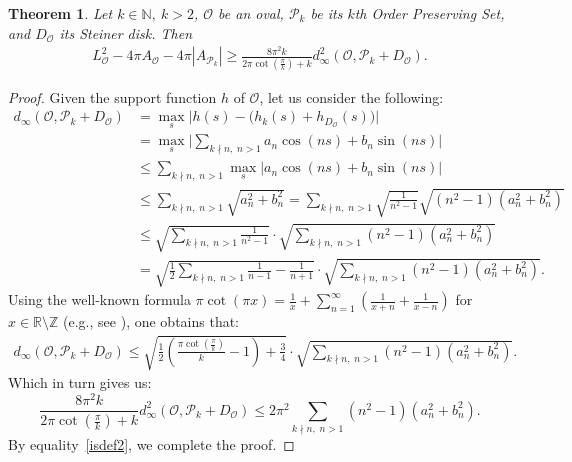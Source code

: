 \documentclass{amsart}
\newtheorem{thm}{Theorem}[section]
\theoremstyle{definition}
\numberwithin{equation}{section}
\begin{document}
\begin{thm}\label{Thmstab1}
Let $k\in \mathbb{N},\ k>2$, $\mathcal{O}$ be an oval, $\mathcal{P}_k$ be its $k$th Order Preserving Set, and $D_{\mathcal{O}}$ its Steiner disk. Then
\begin{align*}
     L_{\mathcal{O}}^2 - 4\pi A_{\mathcal{O}}-4\pi |A_{\mathcal{P}_k}|\geqslant\frac{8\pi^2k}{2 \pi \cot\left(\frac{\pi}{k}\right) +k}d^2_\infty(\mathcal{O},\mathcal{P}_k+ D_{\mathcal{O}}).
\end{align*}
\end{thm}
\begin{proof}
     Given the support function $h$ of $\mathcal{O}$, let us consider the following:
     \begin{align*}       
     d_\infty(\mathcal{O},\mathcal{P}_k+ D_{\mathcal{O}})&=\max_s\Big|h(s)-\Big(h_k(s) + h_{D_{\mathcal{O}}}(s)\Big)\Big|\\ &=\max_s\Big|\sum_{k \nmid n,\; n>1}a_n\cos(ns)+b_n\sin(ns)\Big|\\
     &\leqslant \sum_{k \nmid n, \;n>1}\max_s|a_n\cos(ns)+b_n\sin(ns) |\\
     &\leqslant  \sum_{k \nmid n,\; n>1}\sqrt{a_n^2+b_n^2 }=\sum_{k \nmid n,\; n>1}\sqrt{\frac{1}{n^2-1}}\sqrt{(n^2-1)(a_n^2+b_n^2) } \\
     &\leqslant\sqrt{\sum_{k \nmid n,\; n>1}\frac{1}{n^2-1}} \cdot\sqrt{\sum_{k \nmid n,\; n>1}(n^2-1)(a_n^2+b_n^2)}\\
     &= \sqrt{\frac{1}{2}\sum_{k \nmid n,\; n>1}\frac{1}{n-1} - \frac{1}{n+1}}\cdot\sqrt{\sum_{k \nmid n,\; n>1}(n^2-1)(a_n^2+b_n^2)}.\end{align*} Using the well-known formula $\pi\cot\left(\pi x\right)=\frac{1}{x}+\sum_{n=1}^{\infty}\left(\frac{1}{x+n}+\frac{1}{x-n}\right)$ for $x\in\mathbb{R}\setminus\mathbb{Z}$ (e.g., see \cite{thebook}),  one obtains that:
      \begin{align*}       
     d_\infty(\mathcal{O},\mathcal{P}_k+ D_{\mathcal{O}})\leqslant \sqrt{\frac{1}{2} \left( \frac{\pi \cot\left(\frac{\pi}{k}\right)}{k} - 1 \right) + \frac{3}{4}}\cdot\sqrt{\sum_{k \nmid n,\; n>1}(n^2-1)(a_n^2+b_n^2)}.
\end{align*}
Which in turn gives us:
$$\frac{8\pi^2k}{2 \pi \cot\left(\frac{\pi}{k}\right) +k}d^2_\infty(\mathcal{O},\mathcal{P}_k+ D_{\mathcal{O}}) \leqslant 2\pi^2\sum_{k \nmid n,\; n>1}(n^2-1)(a_n^2+b_n^2).$$
By equality~\eqref{isdef2}, we complete the proof.
\end{proof}
\end{document}
